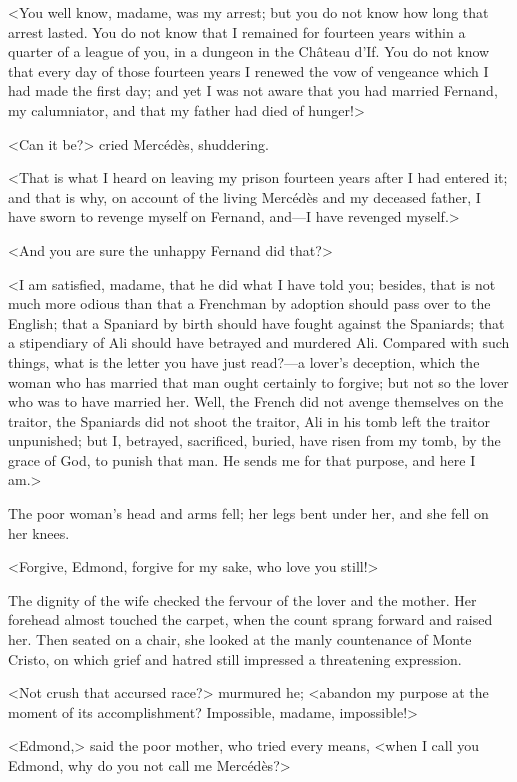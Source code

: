  <You well know, madame, was my arrest; but you do not know how long that arrest lasted. You do not know that I remained for fourteen years within a quarter of a league of you, in a dungeon in the Château d'If. You do not know that every day of those fourteen years I renewed the vow of vengeance which I had made the first day; and yet I was not aware that you had married Fernand, my calumniator, and that my father had died of hunger!> 

 <Can it be?> cried Mercédès, shuddering. 

 <That is what I heard on leaving my prison fourteen years after I had entered it; and that is why, on account of the living Mercédès and my deceased father, I have sworn to revenge myself on Fernand, and—I have revenged myself.> 

 <And you are sure the unhappy Fernand did that?> 

 <I am satisfied, madame, that he did what I have told you; besides, that is not much more odious than that a Frenchman by adoption should pass over to the English; that a Spaniard by birth should have fought against the Spaniards; that a stipendiary of Ali should have betrayed and murdered Ali. Compared with such things, what is the letter you have just read?—a lover's deception, which the woman who has married that man ought certainly to forgive; but not so the lover who was to have married her. Well, the French did not avenge themselves on the traitor, the Spaniards did not shoot the traitor, Ali in his tomb left the traitor unpunished; but I, betrayed, sacrificed, buried, have risen from my tomb, by the grace of God, to punish that man. He sends me for that purpose, and here I am.> 

 The poor woman's head and arms fell; her legs bent under her, and she fell on her knees. 

 <Forgive, Edmond, forgive for my sake, who love you still!> 

 The dignity of the wife checked the fervour of the lover and the mother. Her forehead almost touched the carpet, when the count sprang forward and raised her. Then seated on a chair, she looked at the manly countenance of Monte Cristo, on which grief and hatred still impressed a threatening expression. 

 <Not crush that accursed race?> murmured he; <abandon my purpose at the moment of its accomplishment? Impossible, madame, impossible!> 

 <Edmond,> said the poor mother, who tried every means, <when I call you Edmond, why do you not call me Mercédès?> 


